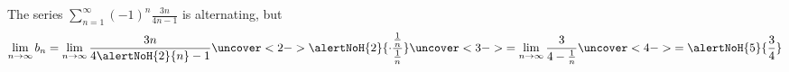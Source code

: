 \begin{frame}
\begin{example} %
The series $\sum_{n=1}^\infty (-1)^n \frac{3n}{4n-1}$ is alternating, but
\[
\lim_{n\to\infty} b_n = \lim_{n\to\infty} \frac{3n}{4\alertNoH{ 2}{n}-1}\uncover<2->{\alertNoH{ 2}{\cdot \frac{\frac{1}{n}}{\frac{1}{n}}}}%
\uncover<3->{%
 = \lim_{n\to\infty} \frac{3}{4-\frac{1}{n}}%
}%
\uncover<4->{%
 = \alertNoH{ 5}{\frac{3}{4}}%
}%
\]
\end{example}
\end{frame}
